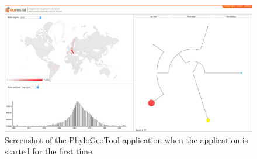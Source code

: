 \documentclass[a4paper, 11pt]{article} %
\begin{document}
\begin{figure}[!htbp]
\includegraphics[scale=0.19]{images/defaultScreenshot.png}
\caption{Screenshot of the PhyloGeoTool application when the application is started for the first time.}
\label{fig:01} 
\end{figure}
\end{document}
